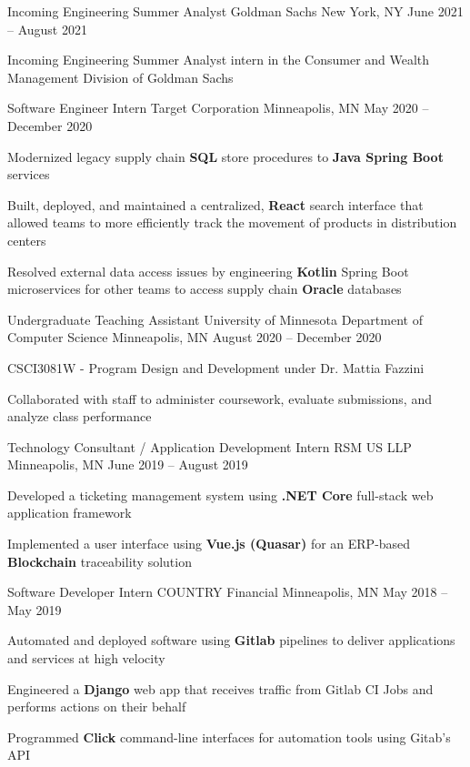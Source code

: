 \documentclass[]{awesome-cv}
\begin{document}
\vspace{-9mm}
\begin{cventries}
    \cventry
	{Incoming Engineering Summer Analyst}
	{Goldman Sachs}
	{New York, NY}
	{June 2021 – August 2021}
	{\begin{cvitems}
		\item {Incoming Engineering Summer Analyst intern in the Consumer and Wealth Management Division of Goldman Sachs}
		\end{cvitems}}
	\cventry
	{Software Engineer Intern}
	{Target Corporation}
	{Minneapolis, MN}
	{May 2020 – December 2020}
	{\begin{cvitems}
		\item {Modernized legacy supply chain \textbf{SQL} store procedures to \textbf{Java Spring Boot} services}
		\item {Built, deployed, and maintained a centralized, \textbf{React} search interface that allowed teams to more efficiently track the movement of products in distribution centers}
		\item {Resolved external data access issues by engineering \textbf{Kotlin} Spring Boot microservices for other teams to access supply chain \textbf{Oracle} databases}
		\end{cvitems}}
	\cventry
	{Undergraduate Teaching Assistant}
	{University of Minnesota Department of Computer Science}
	{Minneapolis, MN}
	{August 2020 – December 2020}
	{\begin{cvitems}
    	\item {CSCI3081W - Program Design and Development under Dr. Mattia Fazzini}
		\item {Collaborated with staff to administer coursework, evaluate submissions, and analyze class performance}
		\end{cvitems}}
	\cventry
	{Technology Consultant / Application Development Intern}
	{RSM US LLP}
	{Minneapolis, MN}
	{June 2019 – August 2019}
	{\begin{cvitems}
		\item {Developed a ticketing management system using  \textbf{.NET Core} full-stack web application framework}
		\item {Implemented a user interface using \textbf{Vue.js (Quasar)} for an ERP-based \textbf{Blockchain} traceability solution}
		\end{cvitems}}
	\cventry
	{Software Developer Intern}
	{COUNTRY Financial}
	{Minneapolis, MN}
	{May 2018 – May 2019}
	{\begin{cvitems}
		\item {Automated and deployed software using \textbf{Gitlab} pipelines to deliver applications and services at high velocity}
		\item {Engineered a \textbf{Django} web app that receives traffic from Gitlab CI Jobs and performs actions on their behalf}
		\item{Programmed \textbf{Click} command-line interfaces for automation tools using Gitab’s API}
		\end{cvitems}}
\end{cventries}
\end{document}
